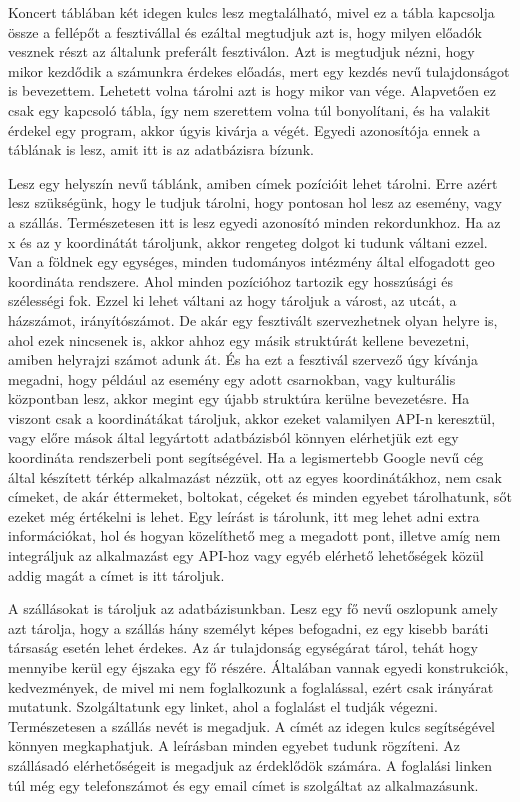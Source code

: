 Koncert táblában két idegen kulcs lesz megtalálható, mivel ez a tábla kapcsolja össze a fellépőt a fesztivállal és ezáltal megtudjuk azt is, hogy milyen előadók vesznek részt az általunk preferált fesztiválon. Azt is megtudjuk nézni, hogy mikor kezdődik a számunkra érdekes előadás, mert egy kezdés nevű tulajdonságot is bevezettem. Lehetett volna tárolni azt is hogy mikor van vége. Alapvetően ez csak egy kapcsoló tábla, így nem szerettem volna túl bonyolítani, és ha valakit érdekel egy program, akkor úgyis kivárja a végét. Egyedi azonosítója ennek a táblának is lesz, amit itt is az adatbázisra bízunk.

Lesz egy helyszín nevű táblánk, amiben címek pozícióit lehet tárolni. Erre azért lesz szükségünk, hogy le tudjuk tárolni, hogy pontosan hol lesz az esemény, vagy a szállás. Természetesen itt is lesz egyedi azonosító minden rekordunkhoz. Ha az x és az y koordinátát tároljunk, akkor rengeteg dolgot ki tudunk váltani ezzel. Van a földnek egy egységes, minden tudományos intézmény által elfogadott geo koordináta rendszere. Ahol minden pozícióhoz tartozik egy hosszúsági és szélességi fok. Ezzel ki lehet váltani az hogy tároljuk a várost, az utcát, a házszámot, irányítószámot. De akár egy fesztivált szervezhetnek olyan helyre is, ahol ezek nincsenek is, akkor ahhoz egy másik struktúrát kellene bevezetni, amiben helyrajzi számot adunk át. És ha ezt a fesztivál szervező úgy kívánja megadni, hogy például az esemény egy adott csarnokban, vagy kulturális központban lesz, akkor megint egy újabb struktúra kerülne bevezetésre. Ha viszont csak a koordinátákat tároljuk, akkor ezeket valamilyen API-n keresztül, vagy előre mások által legyártott adatbázisból könnyen elérhetjük ezt egy koordináta rendszerbeli pont segítségével. Ha a legismertebb Google nevű cég által készített térkép alkalmazást nézzük, ott az egyes koordinátákhoz, nem csak címeket, de akár éttermeket, boltokat, cégeket és minden egyebet tárolhatunk, sőt ezeket még értékelni is lehet. Egy leírást is tárolunk, itt meg lehet adni extra információkat, hol és hogyan közelíthető meg a megadott pont, illetve amíg nem integráljuk az alkalmazást egy API-hoz vagy egyéb elérhető lehetőségek közül addig magát a címet is itt tároljuk.

A szállásokat is tároljuk az adatbázisunkban. Lesz egy fő nevű oszlopunk amely azt tárolja, hogy a szállás hány személyt képes befogadni, ez egy kisebb baráti társaság esetén lehet érdekes. Az ár tulajdonság egységárat tárol, tehát hogy mennyibe kerül egy éjszaka egy fő részére. Általában vannak egyedi konstrukciók, kedvezmények, de mivel mi nem foglalkozunk a foglalással, ezért csak irányárat mutatunk. Szolgáltatunk egy linket, ahol a foglalást el tudják végezni. Természetesen a szállás nevét is megadjuk. A címét az idegen kulcs segítségével könnyen megkaphatjuk. A leírásban minden egyebet tudunk rögzíteni. Az szállásadó elérhetőségeit is megadjuk az érdeklődök számára. A foglalási linken túl még egy telefonszámot és egy email címet is szolgáltat az alkalmazásunk.

